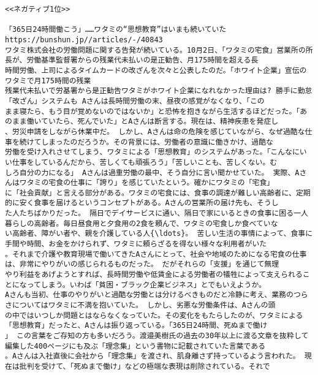 \documentclass[11pt]{article}
\begin{document}
    \begin{Verbatim}[commandchars=\\\{\}]
<<ネガティブ1位>>

「365日24時間働こう」……ワタミの“思想教育”はいまも続いていた
https://bunshun.jp//articles/-/40843
ワタミ株式会社の労働問題に関する告発が続いている。10月2日、「ワタミの宅食」営業所の所長が、労働基準監督署からの残業代未払いの是正勧告、月175時間を超える長
時間労働、上司によるタイムカードの改ざんを次々と公表したのだ。「ホワイト企業」宣伝のワタミで月175時間の残業
残業代未払いで労基署から是正勧告ワタミがホワイト企業になれなかった理由は? 勝手に勤怠「改ざん」システムも Aさんは長時間労働の末、昼夜の感覚がなくなり、「この
まま寝たら、もう目が覚めないのではないか」と恐怖を抱きながら生活するほどだった。「あのまま働いていたら、死んでいた」とAさんは断言する。現在は、精神疾患を発症し
、労災申請をしながら休業中だ。 しかし、Aさんは命の危険を感じていながら、なぜ過酷な仕事を続けてしまったのだろうか。その背景には、労働者の意識に働きかけ、過酷な
労働を受け入れさせてしまう、ワタミによる「思想教育」のシステムがあった。「こんなにいい仕事をしているんだから、苦しくても頑張ろう」「苦しいことも、苦しくない。む
しろ自分の力になる」 Aさんは過重労働の最中、そう自分に言い聞かせていた。 実際、Aさんはワタミの宅食の仕事に「誇り」を感じていたという。確かにワタミの「宅食」
に「社会貢献」と言える部分がある。ワタミの宅食には、食事の調達が難しい高齢者に、定期的に安く食事を届けるというコンセプトがある。Aさんの営業所の届け先も、そうし
た人たちばかりだった。 隔日でデイサービスに通い、隔日で家にいるときの食事に困る一人暮らしの高齢者。毎日昼食用と夕食用の2食を頼んで、ワタミの宅食しか食べていな
い高齢者、障がい者や、親を介護している人{\ldots}。 苦しい生活の事情によって、食事に手間や時間、お金をかけられず、ワタミに頼らざるを得ない様々な利用者がいた
。それまで介護や教育現場で働いてきたAさんにとって、社会や地域のためになる宅食の仕事は、非常にやりがいの感じられるものだった。 だがそれらの「支援」を通じて無理
やり利益をあげようとすれば、長時間労働や低賃金による労働者の犠牲によって支えられることになってしまう。いわば「貧困・ブラック企業ビジネス」とでもいえようか。
Aさんも当初、仕事のやりがいと過酷な労働とは分けるべきものだと冷静に考え、業務のつらさについてはワタミに不満を抱いていた。 しかし、劣悪な労働条件は、Aさんの頭
の中ではいつしか問題とはならなくなっていた。その変化をもたらしたのが、ワタミによる「思想教育」だったと、Aさんは振り返っている。「365日24時間、死ぬまで働け
」 この言葉をご存知の方も多いだろう。渡邉美樹氏の過去の30年以上に渡る文章を抜粋して編集した400ページにも及ぶ「理念集」という書物に記載されていた言葉である
。Aさんは入社直後に会社から「理念集」を渡され、肌身離さず持っているよう言われた。 現在は批判を受けて、「死ぬまで働け」などの極端な表現は削除されている。それで

\end{Verbatim}
\end{document}
